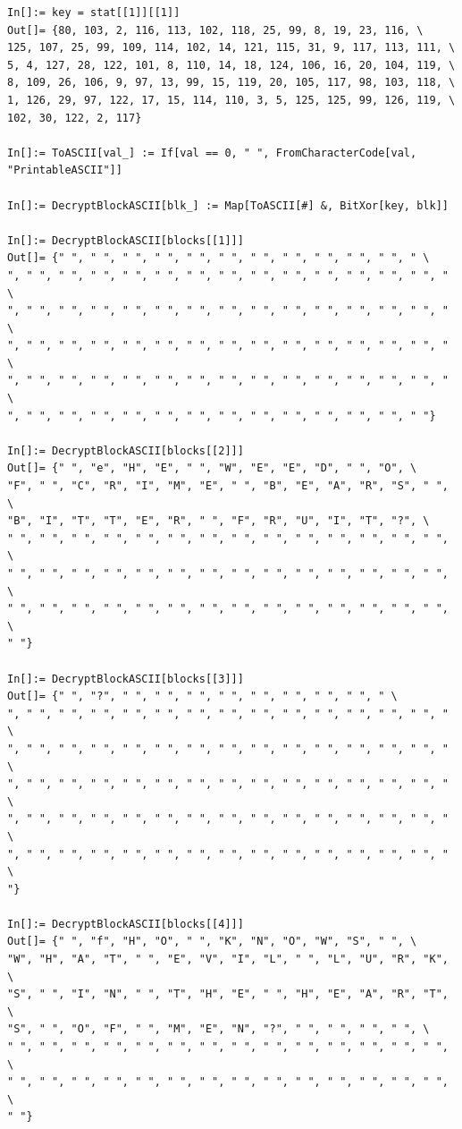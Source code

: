 \begin{lstlisting}[style=custommath]
In[]:= key = stat[[1]][[1]]
Out[]= {80, 103, 2, 116, 113, 102, 118, 25, 99, 8, 19, 23, 116, \
125, 107, 25, 99, 109, 114, 102, 14, 121, 115, 31, 9, 117, 113, 111, \
5, 4, 127, 28, 122, 101, 8, 110, 14, 18, 124, 106, 16, 20, 104, 119, \
8, 109, 26, 106, 9, 97, 13, 99, 15, 119, 20, 105, 117, 98, 103, 118, \
1, 126, 29, 97, 122, 17, 15, 114, 110, 3, 5, 125, 125, 99, 126, 119, \
102, 30, 122, 2, 117}

In[]:= ToASCII[val_] := If[val == 0, " ", FromCharacterCode[val, "PrintableASCII"]]

In[]:= DecryptBlockASCII[blk_] := Map[ToASCII[#] &, BitXor[key, blk]]

In[]:= DecryptBlockASCII[blocks[[1]]]
Out[]= {" ", " ", " ", " ", " ", " ", " ", " ", " ", " ", " ", " \
", " ", " ", " ", " ", " ", " ", " ", " ", " ", " ", " ", " ", " ", " \
", " ", " ", " ", " ", " ", " ", " ", " ", " ", " ", " ", " ", " ", " \
", " ", " ", " ", " ", " ", " ", " ", " ", " ", " ", " ", " ", " ", " \
", " ", " ", " ", " ", " ", " ", " ", " ", " ", " ", " ", " ", " ", " \
", " ", " ", " ", " ", " ", " ", " ", " ", " ", " ", " ", " ", " "}

In[]:= DecryptBlockASCII[blocks[[2]]]
Out[]= {" ", "e", "H", "E", " ", "W", "E", "E", "D", " ", "O", \
"F", " ", "C", "R", "I", "M", "E", " ", "B", "E", "A", "R", "S", " ", \
"B", "I", "T", "T", "E", "R", " ", "F", "R", "U", "I", "T", "?", \
" ", " ", " ", " ", " ", " ", " ", " ", " ", " ", " ", " ", " ", " ", \
" ", " ", " ", " ", " ", " ", " ", " ", " ", " ", " ", " ", " ", " ", \
" ", " ", " ", " ", " ", " ", " ", " ", " ", " ", " ", " ", " ", " ", \
" "}

In[]:= DecryptBlockASCII[blocks[[3]]]
Out[]= {" ", "?", " ", " ", " ", " ", " ", " ", " ", " ", " \
", " ", " ", " ", " ", " ", " ", " ", " ", " ", " ", " ", " ", " ", " \
", " ", " ", " ", " ", " ", " ", " ", " ", " ", " ", " ", " ", " ", " \
", " ", " ", " ", " ", " ", " ", " ", " ", " ", " ", " ", " ", " ", " \
", " ", " ", " ", " ", " ", " ", " ", " ", " ", " ", " ", " ", " ", " \
", " ", " ", " ", " ", " ", " ", " ", " ", " ", " ", " ", " ", " ", " \
"}

In[]:= DecryptBlockASCII[blocks[[4]]]
Out[]= {" ", "f", "H", "O", " ", "K", "N", "O", "W", "S", " ", \
"W", "H", "A", "T", " ", "E", "V", "I", "L", " ", "L", "U", "R", "K", \
"S", " ", "I", "N", " ", "T", "H", "E", " ", "H", "E", "A", "R", "T", \
"S", " ", "O", "F", " ", "M", "E", "N", "?", " ", " ", " ", " ", \
" ", " ", " ", " ", " ", " ", " ", " ", " ", " ", " ", " ", " ", " ", \
" ", " ", " ", " ", " ", " ", " ", " ", " ", " ", " ", " ", " ", " ", \
" "}
\end{lstlisting}


